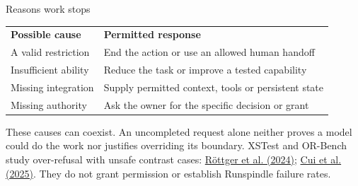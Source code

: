 \begin{frame}[label=diagnosis]{Reasons work stops}
\begin{tabular}{p{.27\linewidth}p{.64\linewidth}}
\textbf{Possible cause} & \textbf{Permitted response} \\
A valid restriction & End the action or use an allowed human handoff \\
Insufficient ability & Reduce the task or improve a tested capability \\
Missing integration & Supply permitted context, tools or persistent state \\
Missing authority & Ask the owner for the specific decision or grant \\
\end{tabular}
\par\medskip
These causes can coexist. An uncompleted request alone neither proves a model
could do the work nor justifies overriding its boundary.
\vfill
{\footnotesize XSTest and OR-Bench study over-refusal with unsafe contrast cases:
\href{https://arxiv.org/abs/2308.01263}{R\"ottger et al. (2024)};
\href{https://arxiv.org/abs/2405.20947}{Cui et al. (2025)}.
They do not grant permission or establish Runspindle failure rates.}
\end{frame}
